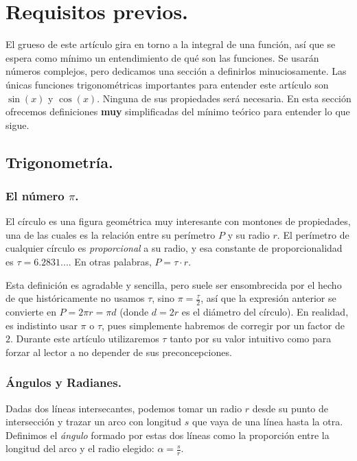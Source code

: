 \section{Requisitos previos.}

El grueso de este artículo gira en torno a la integral de una función, así que se espera como mínimo un entendimiento de qué son las funciones. Se usarán números complejos, pero dedicamos una sección a definirlos minuciosamente. Las únicas funciones trigonométricas importantes para entender este artículo son $\sin(x)$ y $\cos(x)$. Ninguna de sus propiedades será necesaria. En esta sección ofrecemos definiciones \textbf{muy} simplificadas del mínimo teórico para entender lo que sigue.

\subsection{Trigonometría.} \label{trig}

\subsubsection{El número $\pi$.}

El círculo es una figura geométrica muy interesante con montones de propiedades, una de las cuales es la relación entre su perímetro $P$ y su radio $r$. El perímetro de cualquier círculo es \textit{proporcional} a su radio, y esa constante de proporcionalidad es $\tau = 6.2831...$. En otras palabras, $P = \tau \cdot r$.

Esta definición es agradable y sencilla, pero suele ser ensombrecida por el hecho de que históricamente no usamos $\tau$, sino $\pi = \frac{\tau}{2}$, así que la expresión anterior se convierte en $P = 2 \pi r = \pi d$ (donde $d = 2r$ es el diámetro del círculo). En realidad, es indistinto usar $\pi$ o $\tau$, pues simplemente habremos de corregir por un factor de $2$. Durante este artículo utilizaremos $\tau$ tanto por su valor intuitivo como para forzar al lector a no depender de sus preconcepciones.

\subsubsection{Ángulos y Radianes.}

Dadas dos líneas intersecantes, podemos tomar un radio $r$ desde su punto de intersección y trazar un arco con longitud $s$ que vaya de una línea hasta la otra. Definimos el \textit{ángulo} formado por estas dos líneas como la proporción entre la longitud del arco y el radio elegido: $\alpha = \frac{s}{r}$.

